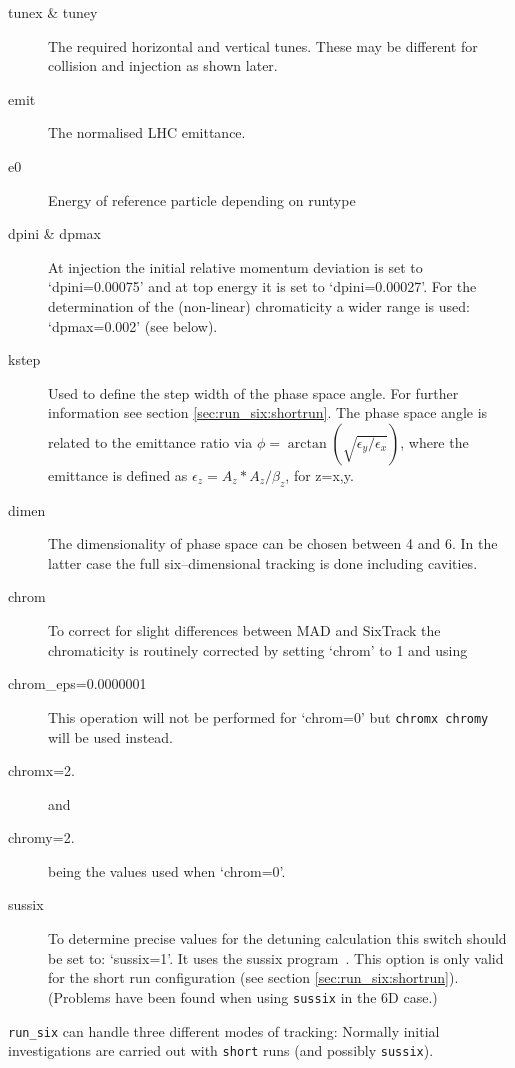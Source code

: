\documentclass{article}    %
\begin{document}
\begin{description}
\item [tunex \& tuney] The required horizontal and vertical tunes.
These may be different for collision and injection as shown later.
\item [emit] The normalised LHC emittance.
\item [e0] Energy of reference particle depending on runtype
\item [dpini \& dpmax]
  At injection the initial relative momentum deviation is set to
  `dpini=0.00075' and at top energy it is set to `dpini=0.00027'.
  For the determination of the (non-linear) chromaticity a 
  wider range is used: `dpmax=0.002' (see below).
\item [kstep]
  Used to define the step width of the phase space angle. For
  further information see section \ref{sec:run_six:shortrun}. The
  phase space angle is related
  to the emittance ratio via 
  $\phi=\arctan\left(\sqrt{{\epsilon_y}/{\epsilon_x}}\right)$,
  where the emittance is defined as
  $\epsilon_z=A_z*A_z/\beta_z$,
  for z=x,y.
\item [dimen]
  The dimensionality of phase space can be chosen between 4 and 6. In
  the latter case the full six--dimensional tracking is done including
  cavities.
\item [chrom]
  To correct for slight differences between MAD and SixTrack the
  chromaticity is routinely corrected by setting `chrom' to 1 and using
\item[chrom\_eps=0.0000001] This operation will not be performed for 
`chrom=0' but {\tt chromx chromy} will be used instead. 
\item[chromx=2.] and
\item[chromy=2.] being the values used when `chrom=0'.

\item [sussix]
  To determine precise values for the detuning calculation this switch
  should be set to: `sussix=1'. It uses the sussix
  program~\cite{lines3}. This option is only valid for the short run
  configuration (see section \ref{sec:run_six:shortrun}).
  (Problems have been found when using {\tt sussix} in the 6D case.)
\end{description}

{\tt run\_six} can handle three different modes of tracking:
Normally initial investigations are carried out with {\tt short}
runs (and possibly {\tt sussix}).
\end{document}
